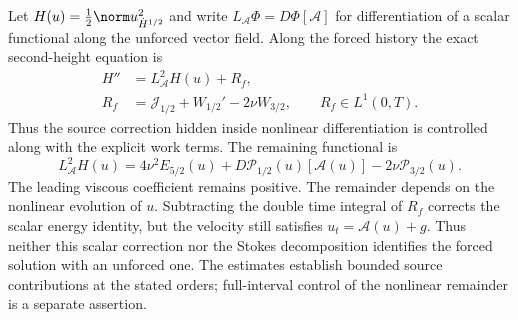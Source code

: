 Let $H(u)=\frac12\norm u_{\dot H^{1/2}}^2$ and write
$L_{\mathcal A}\Phi=D\Phi[\mathcal A]$ for differentiation of a scalar functional along the unforced vector field. Along the forced history the exact second-height equation is
\begin{equation}\label{r:joined-eq:generatorcomparison}
\begin{aligned}
H''&=L_{\mathcal A}^2H(u)+R_f,\\
R_f&=\mathcal J_{1/2}+W_{1/2}'-2\nu W_{3/2},
\qquad R_f\in L^1(0,T).
\end{aligned}
\end{equation}
Thus the source correction hidden inside nonlinear differentiation is controlled along with the explicit work terms. The remaining functional is
\begin{equation}\label{r:joined-eq:autonomousgenerator}
L_{\mathcal A}^2H(u)
=4\nu^2E_{5/2}(u)
+D\mathcal P_{1/2}(u)[\mathcal A(u)]
-2\nu\mathcal P_{3/2}(u).
\end{equation}
The leading viscous coefficient remains positive.
The remainder depends on the nonlinear evolution of \(u\).
Subtracting the double time integral of \(R_f\) corrects the scalar
energy identity, but the velocity still satisfies
\(u_t=\mathcal A(u)+g\). Thus neither this scalar correction nor the
Stokes decomposition identifies the forced solution with an unforced
one. The estimates establish bounded source contributions at the
stated orders; full-interval control of the nonlinear remainder is
a separate assertion.
